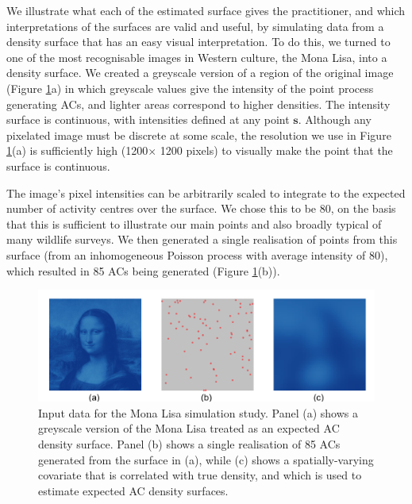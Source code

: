 \documentclass[useAMS,usenatbib,referee]{biom}
\begin{document}
We illustrate what each of the estimated surface gives the practitioner, and which interpretations of the surfaces are valid and useful, by simulating data from a density surface that has an easy visual interpretation. To do this, we turned to one of the most recognisable images in Western culture, the Mona Lisa, into a density surface. We created a greyscale version of a region of the original image (Figure \ref{mlinputs}a) in which greyscale values give the intensity of the point process generating ACs, and lighter areas correspond to higher densities. The intensity surface is continuous, with intensities defined at any point $\bm{s}$. Although any pixelated image must be discrete at some scale, the resolution we use in Figure \ref{mlinputs}(a) is sufficiently high (1200$\times$ 1200 pixels) to visually make the point that the surface is continuous.  

The image's pixel intensities can be arbitrarily scaled to integrate to the expected number of activity centres over the surface. We chose this to be 80, on the basis that this is sufficient to illustrate our main points and also broadly typical of many wildlife surveys. We then generated a single realisation of points from this surface (from an inhomogeneous Poisson process with average intensity of 80), which resulted in 85 ACs being generated (Figure \ref{mlinputs}(b)).

\begin{figure}[htbp]
\centering
\includegraphics[width=1\textwidth]{mona_inputdata.png}
\caption{Input data for the Mona Lisa simulation study. Panel (a) shows a greyscale version of the Mona Lisa treated as an expected AC density surface. Panel (b) shows a single realisation of 85 ACs generated from the surface in (a), while (c) shows a spatially-varying covariate that is correlated with true density, and which is used to estimate expected AC density surfaces.}
\label{mlinputs}
\end{figure}
\end{document}
